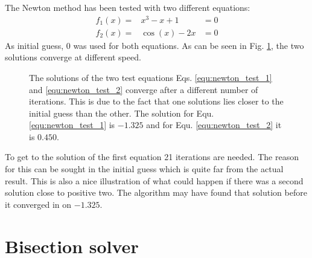 \documentclass{aa}
\begin{document}
The Newton method has been tested with two different equations:
\begin{eqnarray}
    f_1(x) =& x^3 - x + 1 &= 0 \label{equ:newton_test_1}\\
    f_2(x) =& \cos(x) - 2x &= 0 \label{equ:newton_test_2}
\end{eqnarray}
As initial guess, 0 was used for both equations. As can be seen in Fig.
\ref{fig:Newton_results}, the two solutions converge at different speed.
\begin{figure}[htbp]
    \caption{The solutions of the two test equations Eqs.
    \ref{equ:newton_test_1} and \ref{equ:newton_test_2} converge after a
    different number of iterations. This is due to the fact that one solutions
    lies closer to the initial guess than the other. The solution for Equ.
    \ref{equ:newton_test_1} is \(-1.325\) and for Equ. \ref{equ:newton_test_2}
    it is \(0.450\).}
    \label{fig:Newton_results}
\end{figure}
To get to the solution of the first equation 21 iterations are needed. The
reason for this can be sought in the initial guess which is quite far from the
actual result. This is also a nice illustration of what could happen if there
was a second solution close to positive two. The algorithm may have found that
solution before it converged in on \(-1.325\).

\section{Bisection solver}%
\label{sec:bisection_solver}
\end{document}

